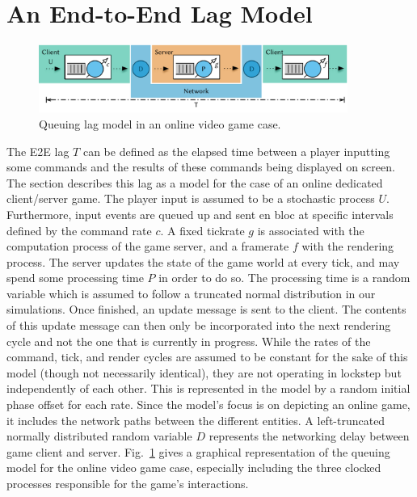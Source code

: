 \section{An End-to-End Lag Model}
\label{sec:model}

\begin{figure}[!t]
	\centering
	\includegraphics[width=0.9\textwidth]{../../../models/e2e-lag-model.pdf}
	\caption{Queuing lag model in an online video game case.}
\label{fig:queuing-model}
\end{figure}

The \gls{E2E} lag $T$ can be defined as the elapsed time between a player inputting some commands and the results of these commands being displayed on screen. The section describes this lag as a model for the case of an online dedicated client/server game. The player input is assumed to be a stochastic process $U$. Furthermore, input events are queued up and sent en bloc at specific intervals defined by the command rate $c$. A fixed tickrate $g$ is associated with the computation process of the game server, and a framerate $f$ with the rendering process. The server updates the state of the game world at every tick, and may spend some processing time $P$ in order to do so. The processing time is a random variable which is assumed to follow a truncated normal distribution in our simulations. Once finished, an update message is sent to the client. The contents of this update message can then only be incorporated into the next rendering cycle and not the one that is currently in progress. While the rates of the command, tick, and render cycles are assumed to be constant for the sake of this model (though not necessarily identical), they are not operating in lockstep but independently of each other. This is represented in the model by a random initial phase offset for each rate. Since the model's focus is on depicting an online game, it includes the network paths between the different entities. A left-truncated normally distributed random variable $D$ represents the networking delay between game client and server. Fig.~\ref{fig:queuing-model} gives a graphical representation of the queuing model for the online video game case, especially including the three clocked processes responsible for the game's interactions.

